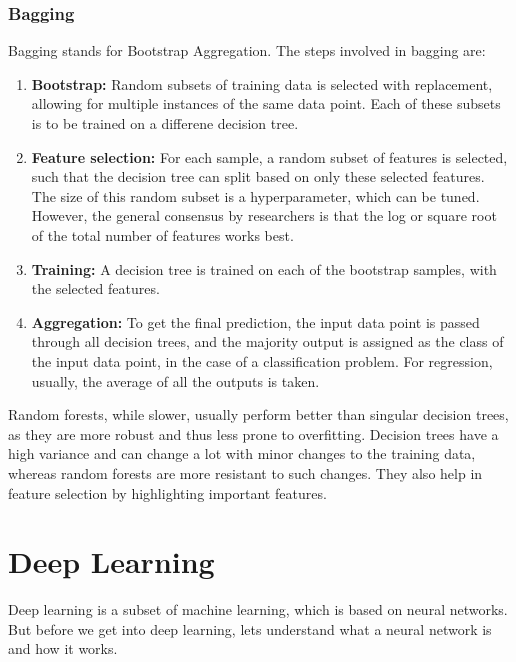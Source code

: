 \documentclass[12pt]{article}
\begin{document}
\subsubsection*{Bagging}
Bagging stands for Bootstrap Aggregation. The steps involved in bagging are:
\begin{enumerate}
    \item \textbf{Bootstrap: }Random subsets of training data is selected with replacement, allowing for multiple instances of the same data point. Each of these subsets is to be trained on a differene decision tree. 
    \item \textbf{Feature selection: }For each sample, a random subset of features is selected, such that the decision tree can split based on only these selected features. The size of this random subset is a hyperparameter, which can be tuned. However, the general consensus by researchers is that the log or square root of the total number of features works best.
    \item \textbf{Training: }A decision tree is trained on each of the bootstrap samples, with the selected features. 
    \item \textbf{Aggregation: }To get the final prediction, the input data point is passed through all decision trees, and the majority output is assigned as the class of the input data point, in the case of a classification problem. For regression, usually, the average of all the outputs is taken.
\end{enumerate}
Random forests, while slower, usually perform better than singular decision trees, as they are more robust and thus less prone to overfitting. Decision trees have a high variance and can change a lot with minor changes to the training data, whereas random forests are more resistant to such changes. They also help in feature selection by highlighting important features. 

\section{Deep Learning}
Deep learning is a subset of machine learning, which is based on neural networks. But before we get into deep learning, lets understand what a neural network is and how it works.
\end{document}
